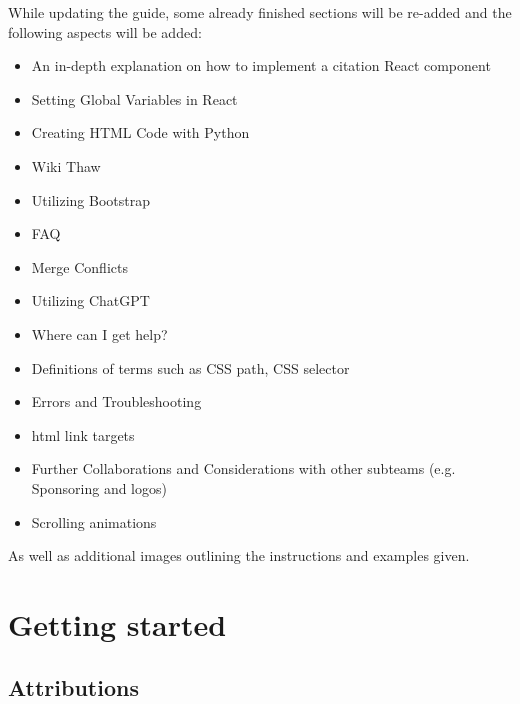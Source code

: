 \documentclass[a4paper, 11pt, twoside]{book}
\begin{document}
While updating the guide, some already finished sections will be re-added and the following aspects will be added:
\begin{itemize}
    \item An in-depth explanation on how to implement a citation React component
    \item Setting Global Variables in React
    \item Creating HTML Code with Python
    \item Wiki Thaw
    \item Utilizing Bootstrap
    \item FAQ
    \item Merge Conflicts
    \item Utilizing ChatGPT
    \item Where can I get help?
    \item Definitions of terms such as CSS path, CSS selector
    \item Errors and Troubleshooting
    \item html link targets
    \item Further Collaborations and Considerations with other subteams (e.g. Sponsoring and logos)
    \item Scrolling animations
\end{itemize}
As well as additional images outlining the instructions and examples given.
\newpage

\mainmatter
\pagecolor{pagecolor}
\chapter{Getting started} \label{sec:started}


\backmatter
\pagecolor{pagecolor}
\section*{Attributions}

\end{document}
